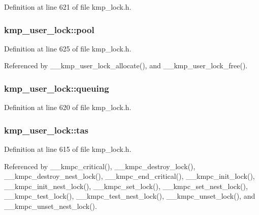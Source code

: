 Definition at line 621 of file kmp\-\_\-lock.\-h.

\hypertarget{unionkmp__user__lock_adda8ec585d9625951bb781831fb3f3b3}{
\subsubsection[{pool}]{ kmp\-\_\-user\-\_\-lock\-::pool}}\label{unionkmp__user__lock_adda8ec585d9625951bb781831fb3f3b3}


Definition at line 625 of file kmp\-\_\-lock.\-h.



Referenced by \-\_\-\-\_\-kmp\-\_\-user\-\_\-lock\-\_\-allocate(), and \-\_\-\-\_\-kmp\-\_\-user\-\_\-lock\-\_\-free().

\hypertarget{unionkmp__user__lock_a62045237fa09ff640f05e05347e7757e}{
\subsubsection[{queuing}]{ kmp\-\_\-user\-\_\-lock\-::queuing}}\label{unionkmp__user__lock_a62045237fa09ff640f05e05347e7757e}


Definition at line 620 of file kmp\-\_\-lock.\-h.

\hypertarget{unionkmp__user__lock_ac0b526819ee392b205697ed5786ccf3f}{
\subsubsection[{tas}]{ kmp\-\_\-user\-\_\-lock\-::tas}}\label{unionkmp__user__lock_ac0b526819ee392b205697ed5786ccf3f}


Definition at line 615 of file kmp\-\_\-lock.\-h.



Referenced by \-\_\-\-\_\-kmpc\-\_\-critical(), \-\_\-\-\_\-kmpc\-\_\-destroy\-\_\-lock(), \-\_\-\-\_\-kmpc\-\_\-destroy\-\_\-nest\-\_\-lock(), \-\_\-\-\_\-kmpc\-\_\-end\-\_\-critical(), \-\_\-\-\_\-kmpc\-\_\-init\-\_\-lock(), \-\_\-\-\_\-kmpc\-\_\-init\-\_\-nest\-\_\-lock(), \-\_\-\-\_\-kmpc\-\_\-set\-\_\-lock(), \-\_\-\-\_\-kmpc\-\_\-set\-\_\-nest\-\_\-lock(), \-\_\-\-\_\-kmpc\-\_\-test\-\_\-lock(), \-\_\-\-\_\-kmpc\-\_\-test\-\_\-nest\-\_\-lock(), \-\_\-\-\_\-kmpc\-\_\-unset\-\_\-lock(), and \-\_\-\-\_\-kmpc\-\_\-unset\-\_\-nest\-\_\-lock().

